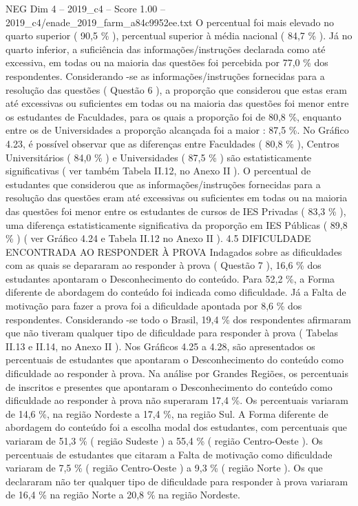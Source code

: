 \begin{textsample}{NEG Dim 4 – 2019\_c4 – Score 1.00 – 2019\_c4/enade\_2019\_farm\_a84c9952ee.txt}
O percentual foi mais elevado no quarto superior ( 90,5 \% ), percentual superior à média nacional ( 84,7 \% ).
Já no quarto inferior, a suficiência das informações/instruções declarada como até excessiva, em todas ou na maioria das questões foi percebida por 77,0 \% dos respondentes.
Considerando -se as informações/instruções fornecidas para a resolução das questões ( Questão 6 ), a proporção que considerou que estas eram até excessivas ou suficientes em todas ou na maioria das questões foi menor entre os estudantes de Faculdades, para os quais a proporção foi de 80,8 \%, enquanto entre os de Universidades a proporção alcançada foi a maior : 87,5 \%.
No Gráfico 4.23, é possível observar que as diferenças entre Faculdades ( 80,8 \% ), Centros Universitários ( 84,0 \% ) e Universidades ( 87,5 \% ) são estatisticamente significativas ( ver também Tabela II.12, no Anexo II ).
O percentual de estudantes que considerou que as informações/instruções fornecidas para a resolução das questões eram até excessivas ou suficientes em todas ou na maioria das questões foi menor entre os estudantes de cursos de IES Privadas ( 83,3 \% ), uma diferença estatisticamente significativa da proporção em IES Públicas ( 89,8 \% ) ( ver Gráfico 4.24 e Tabela II.12 no Anexo II ). 4.5 DIFICULDADE ENCONTRADA AO RESPONDER À PROVA Indagados sobre as dificuldades com as quais se depararam ao responder à prova ( Questão 7 ), 16,6 \% dos estudantes apontaram o Desconhecimento do conteúdo.
Para 52,2 \%, a Forma diferente de abordagem do conteúdo foi indicada como dificuldade.
Já a Falta de motivação para fazer a prova foi a dificuldade apontada por 8,6 \% dos respondentes.
Considerando -se todo o Brasil, 19,4 \% dos respondentes afirmaram que não tiveram qualquer tipo de dificuldade para responder à prova ( Tabelas II.13 e II.14, no Anexo II ).
Nos Gráficos 4.25 a 4.28, são apresentados os percentuais de estudantes que apontaram o Desconhecimento do conteúdo como dificuldade ao responder à prova.
Na análise por Grandes Regiões, os percentuais de inscritos e presentes que apontaram o Desconhecimento do conteúdo como dificuldade ao responder à prova não superaram 17,4 \%.
Os percentuais variaram de 14,6 \%, na região Nordeste a 17,4 \%, na região Sul.
A Forma diferente de abordagem do conteúdo foi a escolha modal dos estudantes, com percentuais que variaram de 51,3 \% ( região Sudeste ) a 55,4 \% ( região Centro-Oeste ).
Os percentuais de estudantes que citaram a Falta de motivação como dificuldade variaram de 7,5 \% ( região Centro-Oeste ) a 9,3 \% ( região Norte ).
Os que declararam não ter qualquer tipo de dificuldade para responder à prova variaram de 16,4 \% na região Norte a 20,8 \% na região Nordeste.

\end{textsample}
